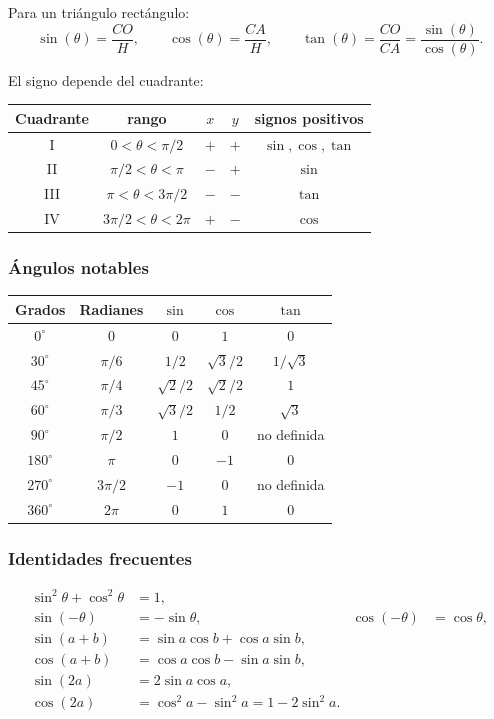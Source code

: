 Para un tri\'angulo rect\'angulo:
\[
\sin(\theta)=\frac{CO}{H},\qquad
\cos(\theta)=\frac{CA}{H},\qquad
\tan(\theta)=\frac{CO}{CA}=\frac{\sin(\theta)}{\cos(\theta)}.
\]

El signo depende del cuadrante:
\begin{center}
\begin{tabular}{ccccc}
Cuadrante & rango & $x$ & $y$ & signos positivos \\
\hline
I & $0<\theta<\pi/2$ & $+$ & $+$ & $\sin,\cos,\tan$ \\
II & $\pi/2<\theta<\pi$ & $-$ & $+$ & $\sin$ \\
III & $\pi<\theta<3\pi/2$ & $-$ & $-$ & $\tan$ \\
IV & $3\pi/2<\theta<2\pi$ & $+$ & $-$ & $\cos$ \\
\end{tabular}
\end{center}

\subsubsection{\'Angulos notables}

\begin{center}
\begin{tabular}{ccccc}
Grados & Radianes & $\sin$ & $\cos$ & $\tan$ \\
\hline
$0^\circ$ & $0$ & $0$ & $1$ & $0$ \\
$30^\circ$ & $\pi/6$ & $1/2$ & $\sqrt3/2$ & $1/\sqrt3$ \\
$45^\circ$ & $\pi/4$ & $\sqrt2/2$ & $\sqrt2/2$ & $1$ \\
$60^\circ$ & $\pi/3$ & $\sqrt3/2$ & $1/2$ & $\sqrt3$ \\
$90^\circ$ & $\pi/2$ & $1$ & $0$ & no definida \\
$180^\circ$ & $\pi$ & $0$ & $-1$ & $0$ \\
$270^\circ$ & $3\pi/2$ & $-1$ & $0$ & no definida \\
$360^\circ$ & $2\pi$ & $0$ & $1$ & $0$ \\
\end{tabular}
\end{center}

\subsubsection{Identidades frecuentes}

\begin{align*}
\sin^2\theta+\cos^2\theta &= 1,\\
\sin(-\theta)&=-\sin\theta, & \cos(-\theta)&=\cos\theta,\\
\sin(a+b)&=\sin a\cos b+\cos a\sin b,\\
\cos(a+b)&=\cos a\cos b-\sin a\sin b,\\
\sin(2a)&=2\sin a\cos a,\\
\cos(2a)&=\cos^2a-\sin^2a=1-2\sin^2a.
\end{align*}

